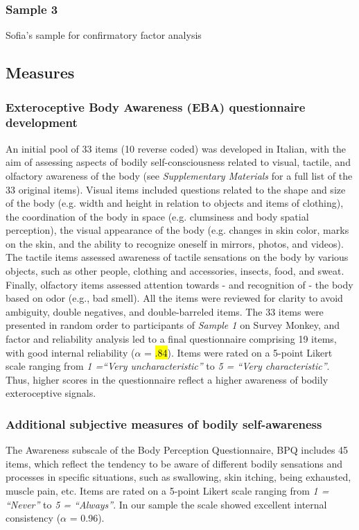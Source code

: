 \documentclass[man]{apa7}
\begin{document}
\subsubsection{Sample 3}
Sofia's sample for confirmatory factor analysis

\subsection{Measures}
\subsubsection{Exteroceptive Body Awareness (EBA) questionnaire development}
An initial pool of 33 items (10 reverse coded) was developed in Italian, with the aim of assessing aspects of bodily self-consciousness related to visual, tactile, and olfactory awareness of the body (see \emph{Supplementary Materials}  for a full list of the 33 original items). Visual items included questions related to the shape and size of the body (e.g. width and height in relation to objects and items of clothing), the coordination of the body in space (e.g. clumsiness and body spatial perception), the visual appearance of the body (e.g. changes in skin color, marks on the skin, and the ability to recognize oneself in mirrors, photos, and videos). The tactile items assessed awareness of tactile sensations on the body by various objects, such as other people, clothing and accessories, insects, food, and sweat. Finally, olfactory items assessed attention towards - and recognition of - the body based on odor (e.g., bad smell). All the items were reviewed for clarity to avoid ambiguity, double negatives, and double-barreled items. The 33 items were presented in random order to participants of \emph{Sample 1}  on Survey Monkey, and factor and reliability analysis led to a final questionnaire comprising 19 items, with good internal reliability ($\alpha$ = \hl{.84}). Items were rated on a 5-point Likert scale ranging from  \emph{1 =“Very uncharacteristic”} to \emph{5 = “Very characteristic”}. Thus, higher scores in the questionnaire reflect a higher awareness of bodily exteroceptive signals. 
\subsubsection{Additional subjective measures of bodily self-awareness} 
The Awareness subscale of the Body Perception Questionnaire, BPQ\parencite{porges1993body} includes 45 items, which reflect the tendency to be aware of different bodily sensations and processes in specific situations, such as swallowing, skin itching, being exhausted, muscle pain, etc. Items are rated on a 5-point Likert scale ranging from \emph{1 = “Never”} to \emph{5 = “Always”}. In our sample the scale showed excellent internal consistency ($\alpha$ = 0.96). 	
\end{document}
